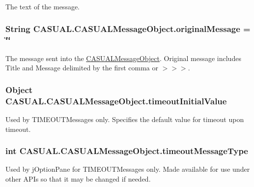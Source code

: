 The text of the message. \hypertarget{class_c_a_s_u_a_l_1_1_c_a_s_u_a_l_message_object_a9716079f17fbab4b81420fb28be1b3d0}{
\subsubsection[{original\-Message}]{\setlength{\rightskip}{0pt plus 5cm}String C\-A\-S\-U\-A\-L.\-C\-A\-S\-U\-A\-L\-Message\-Object.\-original\-Message = \char`\"{}\char`\"{}}}\label{class_c_a_s_u_a_l_1_1_c_a_s_u_a_l_message_object_a9716079f17fbab4b81420fb28be1b3d0}
The message sent into the \hyperlink{class_c_a_s_u_a_l_1_1_c_a_s_u_a_l_message_object}{C\-A\-S\-U\-A\-L\-Message\-Object}. Original message includes Title and Message delimited by the first comma or $>$$>$$>$. \hypertarget{class_c_a_s_u_a_l_1_1_c_a_s_u_a_l_message_object_aadff4442c0e9beed9b99144efb9a99f8}{
\subsubsection[{timeout\-Initial\-Value}]{\setlength{\rightskip}{0pt plus 5cm}Object C\-A\-S\-U\-A\-L.\-C\-A\-S\-U\-A\-L\-Message\-Object.\-timeout\-Initial\-Value}}\label{class_c_a_s_u_a_l_1_1_c_a_s_u_a_l_message_object_aadff4442c0e9beed9b99144efb9a99f8}
Used by T\-I\-M\-E\-O\-U\-T\-Messages only. Specifies the default value for timeout upon timeout. \hypertarget{class_c_a_s_u_a_l_1_1_c_a_s_u_a_l_message_object_a6d7381fc02cd0fa6268f445eaf25f7cb}{
\subsubsection[{timeout\-Message\-Type}]{\setlength{\rightskip}{0pt plus 5cm}int C\-A\-S\-U\-A\-L.\-C\-A\-S\-U\-A\-L\-Message\-Object.\-timeout\-Message\-Type}}\label{class_c_a_s_u_a_l_1_1_c_a_s_u_a_l_message_object_a6d7381fc02cd0fa6268f445eaf25f7cb}
Used by j\-Option\-Pane for T\-I\-M\-E\-O\-U\-T\-Messages only. Made available for use under other A\-P\-Is so that it may be changed if needed.

